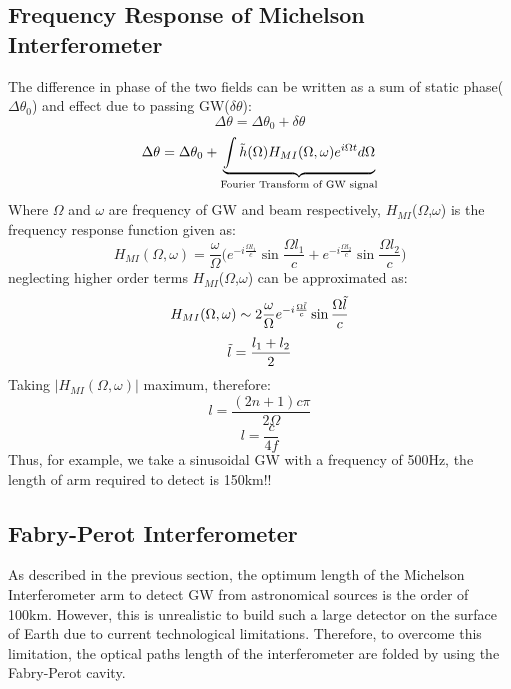 \documentclass[conference]{IEEEtran}
\begin{document}
\subsection{Frequency Response of Michelson Interferometer}
The difference in phase of the two fields can be written as a sum\cite{article5,article6} of static phase($\Delta \theta_0$) and effect due to passing GW($\delta \theta$): 
\begin{equation}
\Delta \theta = \Delta \theta_0 + \delta \theta 
\end{equation}
\begin{equation}
\Delta \theta = \Delta \theta_0 + \underbrace{\int \Tilde{h}{(\Omega)}H_{MI}(\Omega,\omega)e^{i\Omega t}d\Omega}_\text{Fourier Transform of GW signal}
\end{equation}
Where $\Omega$ and $\omega$ are frequency of GW and beam respectively, $H_{MI}$($\Omega$,$\omega$) is the frequency response function given as:
\begin{equation}
H_{MI}(\Omega,\omega)=\frac{\omega}{\Omega}\Big(e^{-i\frac{\Omega l_{1}}{c}}\sin{\frac{\Omega l_{1}}{c}}+e^{-i\frac{\Omega l_{2}}{c}}\sin{\frac{\Omega l_{2}}{c}}\Big)
\end{equation}
neglecting higher order terms $H_{MI}$($\Omega$,$\omega$) can be approximated as:
\begin{equation}
H_{MI}(\Omega,\omega)\sim 2\frac{\omega}{\Omega}e^{-i\frac{\Omega \Tilde{l}}{c}}\sin{\frac{\Omega \Tilde{l}}{c}}
\end{equation}
\begin{equation}
\Tilde{l}=\frac{l_{1}+l_{2}}{2}    
\end{equation}
Taking $|H_{MI}(\Omega,\omega)|$ maximum, therefore:
\begin{equation}
l=\frac{(2n+1)c\pi}{2\Omega}    
\end{equation}
\begin{equation}
l=\frac{c}{4f}
\end{equation}
Thus, for example, we take a sinusoidal GW with a frequency of 500Hz, the length of arm required to detect is 150km!!
\subsection{Fabry-Perot Interferometer}
As described in the previous section, the optimum length of the Michelson Interferometer arm to detect GW from astronomical sources is the order of 100km. However, this is unrealistic to build such a large detector on the surface of Earth due to current technological limitations. Therefore, to overcome this limitation, the optical paths length of the interferometer are folded by using the Fabry-Perot cavity.    
\end{document}
